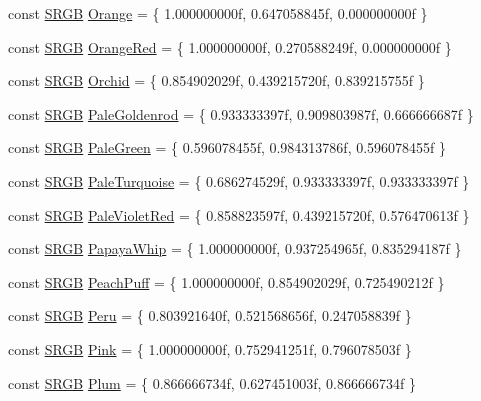 \begin{DoxyCompactItemize}
const \hyperlink{structmage_1_1_s_r_g_b}{S\+R\+GB} \hyperlink{namespacemage_1_1color_afa85dcd9e84a70ecb064915fd5a8d79a}{Orange} = \{ 1.\+000000000f, 0.\+647058845f, 0.\+000000000f \}
\item 
const \hyperlink{structmage_1_1_s_r_g_b}{S\+R\+GB} \hyperlink{namespacemage_1_1color_a16c7871268b776271de85e64d16b176b}{Orange\+Red} = \{ 1.\+000000000f, 0.\+270588249f, 0.\+000000000f \}
\item 
const \hyperlink{structmage_1_1_s_r_g_b}{S\+R\+GB} \hyperlink{namespacemage_1_1color_a47cd4ebcaa73248f12a128697acdbad1}{Orchid} = \{ 0.\+854902029f, 0.\+439215720f, 0.\+839215755f \}
\item 
const \hyperlink{structmage_1_1_s_r_g_b}{S\+R\+GB} \hyperlink{namespacemage_1_1color_a7b6ab88abd4fff6d1214cbf75c2d7488}{Pale\+Goldenrod} = \{ 0.\+933333397f, 0.\+909803987f, 0.\+666666687f \}
\item 
const \hyperlink{structmage_1_1_s_r_g_b}{S\+R\+GB} \hyperlink{namespacemage_1_1color_aeaa7f046f3b3964e4c414dca62a79a77}{Pale\+Green} = \{ 0.\+596078455f, 0.\+984313786f, 0.\+596078455f \}
\item 
const \hyperlink{structmage_1_1_s_r_g_b}{S\+R\+GB} \hyperlink{namespacemage_1_1color_a6ca78d299bf64a69174e212632942c81}{Pale\+Turquoise} = \{ 0.\+686274529f, 0.\+933333397f, 0.\+933333397f \}
\item 
const \hyperlink{structmage_1_1_s_r_g_b}{S\+R\+GB} \hyperlink{namespacemage_1_1color_ab98ff7d1a23ee6285f8c9f17abc452d6}{Pale\+Violet\+Red} = \{ 0.\+858823597f, 0.\+439215720f, 0.\+576470613f \}
\item 
const \hyperlink{structmage_1_1_s_r_g_b}{S\+R\+GB} \hyperlink{namespacemage_1_1color_acb807bd54e2d278c60f516cc245dd52e}{Papaya\+Whip} = \{ 1.\+000000000f, 0.\+937254965f, 0.\+835294187f \}
\item 
const \hyperlink{structmage_1_1_s_r_g_b}{S\+R\+GB} \hyperlink{namespacemage_1_1color_a7cb79ef8e99d5f5d48d859ef2a4dc0f3}{Peach\+Puff} = \{ 1.\+000000000f, 0.\+854902029f, 0.\+725490212f \}
\item 
const \hyperlink{structmage_1_1_s_r_g_b}{S\+R\+GB} \hyperlink{namespacemage_1_1color_a7e55a4957e0be16f89eaad2949b4fe67}{Peru} = \{ 0.\+803921640f, 0.\+521568656f, 0.\+247058839f \}
\item 
const \hyperlink{structmage_1_1_s_r_g_b}{S\+R\+GB} \hyperlink{namespacemage_1_1color_abd654ce3abccac9e26f4a34977209ef2}{Pink} = \{ 1.\+000000000f, 0.\+752941251f, 0.\+796078503f \}
\item 
const \hyperlink{structmage_1_1_s_r_g_b}{S\+R\+GB} \hyperlink{namespacemage_1_1color_ad41f13fc2474a111381b6f8b79e99ec2}{Plum} = \{ 0.\+866666734f, 0.\+627451003f, 0.\+866666734f \}

\end{DoxyCompactItemize}
